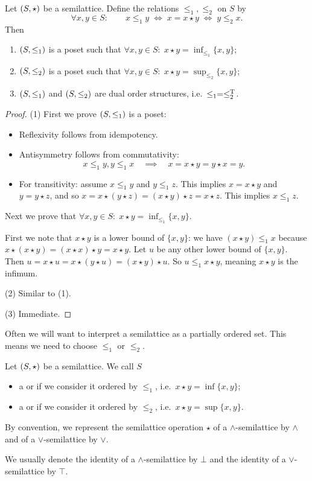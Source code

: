 \begin{proposition} \label{orderSemilattice}
Let $\left( S,\star \right)$ be a semilattice. Define the relations $\leq_1, \leq_2$ on $S$ by
\[ \forall x,y\in S:\qquad x\leq_1 y \; \iff \; x = x\star y \;\iff\; y\leq_2 x. \] 
Then
\begin{enumerate}
\item $\left( S,\leq_1 \right)$ is a poset such that $\forall x,y\in S:\; x\star y = \inf_{\leq_1}\{x,y\}$;
\item $\left( S,\leq_2 \right)$ is a poset such that $\forall x,y\in S:\; x\star y = \sup_{\leq_2}\{x,y\}$;
\item $\left( S,\leq_1 \right)$ and $\left( S,\leq_2 \right)$ are dual order structures, i.e.\ $\leq_1 = \leq_2^{\mathrm{T}}$.
\end{enumerate}
\end{proposition}
\begin{proof}
(1) First we prove $\left( S,\leq_1 \right)$ is a poset:
\begin{itemize}
\item Reflexivity follows from idempotency.
\item Antisymmetry follows from commutativity:
\[ x\leq_1 y, y\leq_1 x \quad\implies\quad x = x\star y = y \star x = y. \]
\item For transitivity: assume $x\leq_1 y$ and $y\leq_1 z$. This implies $x = x\star y$ and $y = y\star z$, and so $x = x\star (y\star z) = (x\star y) \star z = x\star z$. This implies $x\leq_1 z$.
\end{itemize}
Next we prove that $\forall x,y\in S:\; x\star y = \inf_{\leq_1}\{x,y\}$.

First we note that $x \star y$ is a lower bound of $\{x,y\}$: we have $(x\star y) \leq_1 x$ because $x\star(x\star y) = (x\star x)\star y = x\star y$. Let $u$ be any other lower bound of $\{x,y\}$. Then $u = x\star u = x\star (y\star u) = (x\star y)\star u$. So $u \leq_1 x\star y$, meaning $x\star y$ is the infimum.

(2) Similar to (1).

(3) Immediate.
\end{proof}

Often we will want to interpret a semilattice as a partially ordered set. This means we need to choose $\leq_1$ or $\leq_2$.
\begin{definition}
Let $\left( S,\star \right)$ be a semilattice. We call $S$
\begin{itemize}
\item a  or  if we consider it ordered by $\leq_1$, i.e.\ $x\star y = \inf\{x,y\}$;
\item a  or  if we consider it ordered by $\leq_2$, i.e.\ $x\star y = \sup\{x,y\}$.
\end{itemize}
By convention, we represent the semilattice operation $\star$ of a $\wedge$-semilattice by $\wedge$ and of a $\vee$-semilattice by $\vee$.

We usually denote the identity of a $\wedge$-semilattice by $\bot$ and the identity of a $\vee$-semilattice by $\top$.
\end{definition}


